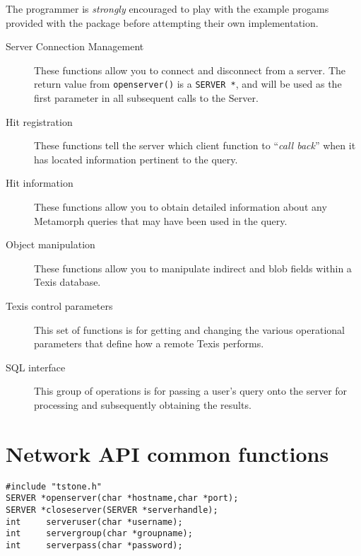 The programmer is {\em strongly} encouraged to play with the example
progams provided with the package before attempting their own
implementation.

\begin{description}
\item[Server Connection Management]

    These functions allow you to connect and disconnect from a server.
    The return value from \verb`openserver()` is a \verb`SERVER *`, and
    will be used as the first parameter in all subsequent calls to
    the Server.

\item[Hit registration]

    These functions tell the server which client function to ``{\em call back}''
    when it has located information pertinent to the query.

\item[Hit information]

    These functions allow you to obtain detailed information about
    any Metamorph queries that may have been used in the query.

\item[Object manipulation]

    These functions allow you to manipulate indirect and blob fields
    within a Texis database.

\item[Texis control parameters]

    This set of functions is for getting and changing the various
    operational parameters that define how a remote Texis performs.

\item[SQL interface]

    This group of operations is for passing a user's query onto the
    server for processing and subsequently obtaining the results.

\end{description}

\chapter{Network API common functions}


\SYNOPSIS
\begin{verbatim}
#include "tstone.h"
SERVER *openserver(char *hostname,char *port);
SERVER *closeserver(SERVER *serverhandle);
int     serveruser(char *username);
int     servergroup(char *groupname);
int     serverpass(char *password);

\end{verbatim}

